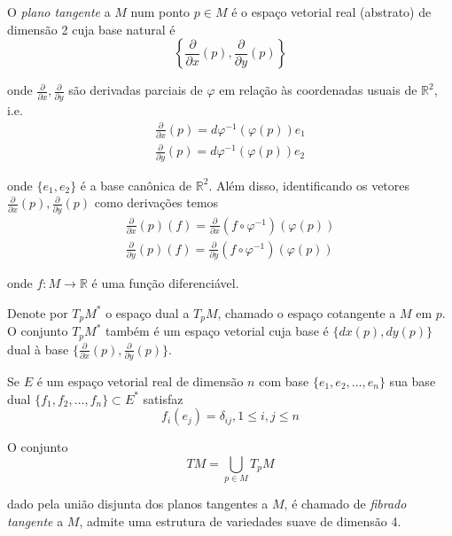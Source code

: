 \begin{defi}
	O \emph{plano tangente} a $M$ num ponto $p \in M$ é o espaço vetorial real (abstrato) de dimensão 2 cuja base natural é
	\begin{equation*}
		\left\{ \frac{\partial}{\partial x} (p), \frac{\partial}{\partial y} (p) \right\}
	\end{equation*}
	
	onde $\frac{\partial}{\partial x}, \frac{\partial}{\partial y}$ são derivadas parciais de $\varphi$ em relação às coordenadas usuais de $\mathbb{R}^2$, i.e.
	\begin{align*}
		\frac{\partial}{\partial x} (p) = d \varphi^{-1} ( \varphi(p) ) e_1\\
		\frac{\partial}{\partial y} (p) = d \varphi^{-1} ( \varphi(p) ) e_2
	\end{align*}
	
	onde $\{ e_1,e_2 \}$ é a base canônica de $\mathbb{R}^2$. Além disso, identificando os vetores $\frac{\partial}{\partial x} (p), \frac{\partial}{\partial y} (p)$ como derivações temos
	\begin{align*}
		\frac{\partial}{\partial x} (p) (f) = \frac{\partial}{\partial x} \left( f \circ \varphi^{-1} \right) (\varphi(p))\\
		\frac{\partial}{\partial y} (p) (f) = \frac{\partial}{\partial y} \left( f \circ \varphi^{-1} \right) (\varphi(p))
	\end{align*}
	
	onde $f: M \rightarrow \mathbb{R}$ é uma função diferenciável.
\end{defi}

\begin{obse}
	Denote por $T_p M^*$ o espaço dual a $T_p M$, chamado o espaço cotangente a $M$ em $p$. O conjunto $T_p M^*$ também é um espaço vetorial cuja base é $\{ dx(p), dy(p)  \}$ dual à base $\{ \frac{\partial}{\partial x}(p), \frac{\partial}{\partial y}(p) \}$.
\end{obse}

\begin{lembrete}
	Se $E$ é um espaço vetorial real de dimensão $n$ com base $\{ e_1, e_2, \ldots, e_n \}$ sua base dual $\{ f_1, f_2, \ldots, f_n \} \subset E^*$ satisfaz
	\begin{equation*}
		f_i (e_j) = \delta_{ij}, 1 \leq i,j \leq n
	\end{equation*}
\end{lembrete}

	O conjunto
	\begin{equation*}
		TM = \bigcup_{p \in M} T_p M
	\end{equation*}
	
	dado pela união disjunta dos planos tangentes a $M$, é chamado de \emph{fibrado tangente} a $M$, admite uma estrutura de variedades suave de dimensão 4.